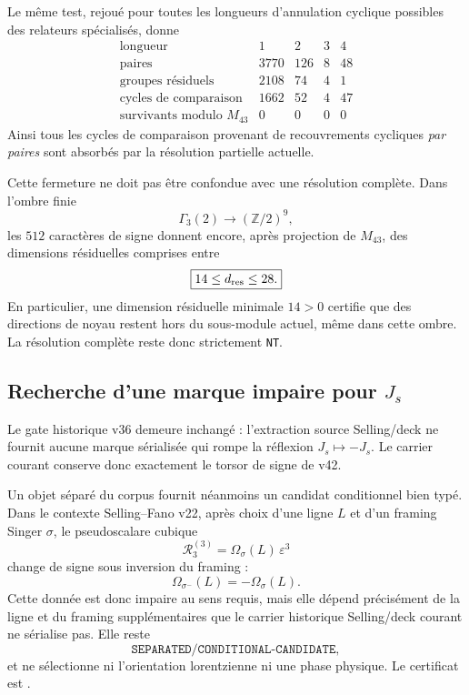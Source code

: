 \documentclass[11pt,a4paper]{article}
\newcommand{\certNT}{\texttt{NT}}
\begin{document}
Le même test, rejoué pour toutes les longueurs d'annulation cyclique possibles des relateurs spécialisés, donne
\[
\begin{array}{c|rrrr}
\text{longueur}&1&2&3&4\\\hline
\text{paires}&3770&126&8&48\\
\text{groupes résiduels}&2108&74&4&1\\
\text{cycles de comparaison}&1662&52&4&47\\
\text{survivants modulo }M_{43}&0&0&0&0
\end{array}
\]
Ainsi tous les cycles de comparaison provenant de recouvrements cycliques \emph{par paires} sont absorbés par la résolution partielle actuelle.

Cette fermeture ne doit pas être confondue avec une résolution complète. Dans l'ombre finie
\[
 \Gamma_3(2)\longrightarrow(\mathbb Z/2)^9,
\]
les $512$ caractères de signe donnent encore, après projection de $M_{43}$, des dimensions résiduelles comprises entre
\[
 \boxed{14\le d_{\rm res}\le28.}
\]
En particulier, une dimension résiduelle minimale $14>0$ certifie que des directions de noyau restent hors du sous-module actuel, même dans cette ombre. La résolution complète reste donc strictement \certNT.

\subsection{Recherche d'une marque impaire pour $J_s$}

Le gate historique v36 demeure inchangé : l'extraction source Selling/deck ne fournit aucune marque sérialisée qui rompe la réflexion $J_s\mapsto-J_s$. Le carrier courant conserve donc exactement le torsor de signe de v42.

Un objet séparé du corpus fournit néanmoins un candidat conditionnel bien typé. Dans le contexte Selling--Fano v22, après choix d'une ligne $L$ et d'un framing Singer $\sigma$, le pseudoscalare cubique
\[
 \mathscr R_3^{(3)}=\Omega_\sigma(L)\,\varepsilon^3
\]
change de signe sous inversion du framing :
\[
 \Omega_{\sigma^-}(L)=-\Omega_\sigma(L).
\]
Cette donnée est donc impaire au sens requis, mais elle dépend précisément de la ligne et du framing supplémentaires que le carrier historique Selling/deck courant ne sérialise pas. Elle reste
\[
 \boxed{\texttt{SEPARATED/CONDITIONAL-CANDIDATE},}
\]
et ne sélectionne ni l'orientation lorentzienne ni une phase physique. Le certificat est .
\end{document}
